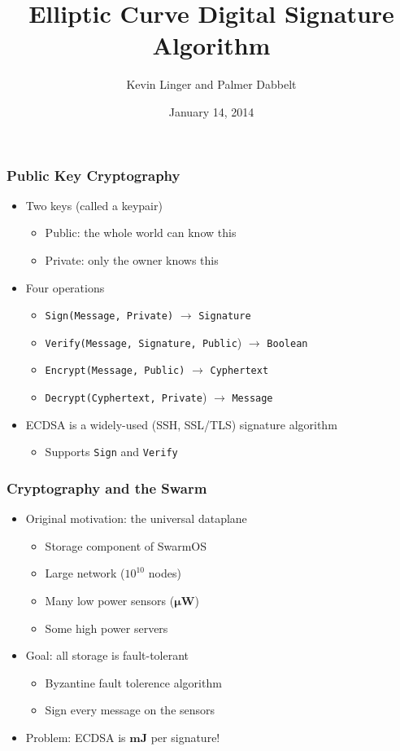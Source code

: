 \documentclass{beamer}
\title{Elliptic Curve Digital Signature Algorithm}
\author{Kevin Linger and Palmer Dabbelt}
\date{January 14, 2014}
\begin{document}
\maketitle

\begin{frame}
  \frametitle{Public Key Cryptography}


  \begin{itemize}
  \item Two keys (called a keypair)
    \begin{itemize}
    \item Public: the whole world can know this
    \item Private: only the owner knows this
    \end{itemize}
  \item Four operations
    \begin{itemize}
    \item \texttt{Sign(Message, Private)} $\rightarrow$ \texttt{Signature}
    \item \texttt{Verify(Message, Signature, Public}) $\rightarrow$ \texttt{Boolean}
    \item \texttt{Encrypt(Message, Public)} $\rightarrow$ \texttt{Cyphertext}
    \item \texttt{Decrypt(Cyphertext, Private}) $\rightarrow$ \texttt{Message}
    \end{itemize}
  \item ECDSA is a widely-used (SSH, SSL/TLS) signature algorithm
    \begin{itemize}
    \item Supports \texttt{Sign} and \texttt{Verify}
    \end{itemize}
  \end{itemize}
\end{frame}

\begin{frame}
  \frametitle{Cryptography and the Swarm}

  \begin{itemize}
  \item Original motivation: the universal dataplane
    \begin{itemize}
      \item Storage component of SwarmOS
      \item Large network ($10^{10}$ nodes)
      \item Many low power sensors ($\bm{\mu} \mathbf{W}$)
      \item Some high power servers
    \end{itemize}
  \item Goal: all storage is fault-tolerant
    \begin{itemize}
    \item Byzantine fault tolerence algorithm
    \item Sign every message on the sensors
    \end{itemize}
  \item Problem: ECDSA is $\mathbf{mJ}$ per signature!
  \end{itemize}
\end{frame}
\end{document}
